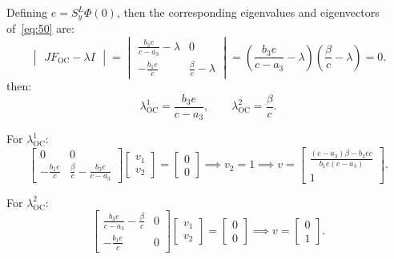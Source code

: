 \documentclass[
    8pt,
    aspectratio=1610,
    c,
    intlimits,
    leqno,
    professionalfonts,
]{beamer}
\begin{document}
\begin{frame}
	Defining $e=S^{L}_{y}\Phi\left(0\right)$, then the corresponding
	eigenvalues and eigenvectors of~\eqref{eq:50} are:
	\begin{equation*}
		\begin{vmatrix}
			JF_{\text{OC}}-\lambda I
		\end{vmatrix}=
		\begin{vmatrix}
			\frac{b_{3}e}{c-a_{3}}-\lambda & 0                       \\
			-\frac{b_{1}e}{c}              & \frac{\beta}{c}-\lambda
		\end{vmatrix}=
		\left(\frac{b_{3}e}{c-a_{3}}-\lambda\right)
		\left(\frac{\beta}{c}-\lambda\right)=
		0.
	\end{equation*}
	then:
	\begin{equation*}
		\lambda^{1}_{\text{OC}}=
		\frac{b_{3}e}{c-a_{3}},\qquad
		\lambda^{2}_{\text{OC}}=
		\frac{\beta}{c}.
	\end{equation*}

	For $\lambda^{1}_{\text{OC}}$:
	\begin{equation*}
		\begin{bmatrix}
			0                 & 0                                      \\
			-\frac{b_{1}e}{c} & \frac{\beta}{c}-\frac{b_{3}e}{c-a_{3}}
		\end{bmatrix}
		\begin{bmatrix}
			v_{1} \\
			v_{2}
		\end{bmatrix}=
		\begin{bmatrix}
			0 \\
			0
		\end{bmatrix}\implies
		v_{2}=1\implies
		v=\begin{bmatrix}
			\frac{
			\left(c-a_{3}\right)\beta-b_{3}ec
			}{b_{1}e\left(c-a_{3}\right)} \\
			1
		\end{bmatrix}.
	\end{equation*}

	For $\lambda^{2}_{\text{OC}}$:
	\begin{equation*}
		\begin{bmatrix}
			\frac{b_{3}e}{c-a_{3}}-\frac{\beta}{c} & 0 \\
			-\frac{b_{1}e}{c}                      & 0
		\end{bmatrix}
		\begin{bmatrix}
			v_{1} \\
			v_{2}
		\end{bmatrix}=
		\begin{bmatrix}
			0 \\
			0
		\end{bmatrix}\implies
		v=\begin{bmatrix}
			0 \\
			1
		\end{bmatrix}.
	\end{equation*}


\end{frame}
\end{document}
